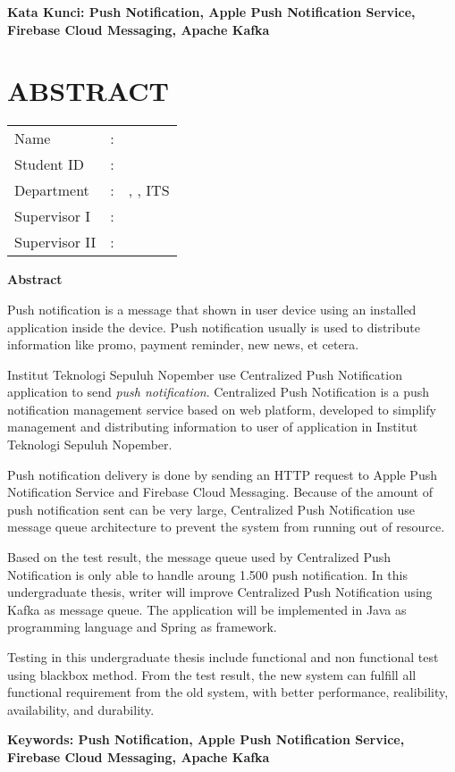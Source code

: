 \vspace*{1em}
\noindent\bfseries Kata Kunci: Push Notification, Apple Push Notification Service, Firebase Cloud Messaging, Apache Kafka
\normalfont
\cleardoublepage

\chapter {ABSTRACT}
\begin{center}
	\noindent\textbf{\MakeUppercase\juduleng}
\end{center}
\vspace*{1em}

\begin{tabularx}{\linewidth}{ l l X }
	Name 			& : & \penulis \\
	Student ID		& :	& \nrp \\
	Department 		& : & \jurusaneng, \newline \fakultaseng, ITS \\
	Supervisor I 	& : & \pembimbingsatu \\
	Supervisor II 	& : & \pembimbingdua
	\vspace*{1em} 	%
\end {tabularx}
	
\noindent\textbf{Abstract} \\
\itshape
\par Push notification is a message that shown in user device using an installed application inside the device. Push notification usually is used to distribute information like promo, payment reminder, new news, et cetera.
\par Institut Teknologi Sepuluh Nopember use Centralized Push Notification application to send \textit{push notification}. Centralized Push Notification is a push notification management service based on web platform, developed to simplify management and distributing information to user of application in Institut Teknologi Sepuluh Nopember.
\par Push notification delivery is done by sending an HTTP request to Apple Push Notification Service and Firebase Cloud Messaging. Because of the amount of push notification sent can be very large, Centralized Push Notification use message queue architecture to prevent the system from running out of resource.
\par Based on the test result, the message queue used by Centralized Push Notification is only able to handle aroung 1.500 push notification. In this undergraduate thesis, writer will improve Centralized Push Notification using Kafka as message queue. The application will be implemented in Java as programming language and Spring as framework.
\par Testing in this undergraduate thesis include functional and non functional test using blackbox method. From the test result, the new system can fulfill all functional requirement from the old system, with better performance, realibility, availability, and durability.

\vspace*{1em}
\noindent\bfseries Keywords: Push Notification, Apple Push Notification Service, Firebase Cloud Messaging, Apache Kafka
\normalfont
\cleardoublepage